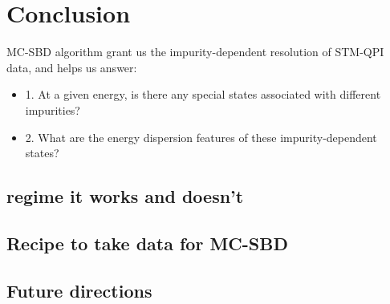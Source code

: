 \section{Conclusion}
\ac{MC-SBD} algorithm grant us the impurity-dependent resolution of STM-QPI data, and helps us answer:
\begin{itemize}
	\item 1. At a given energy, is there any special states associated with different impurities?
	\item 2. What are the energy dispersion features of these impurity-dependent states?
\end{itemize} 
\subsection{regime it works and doesn't}
\subsection{Recipe to take data for MC-SBD}
\subsection{Future directions}